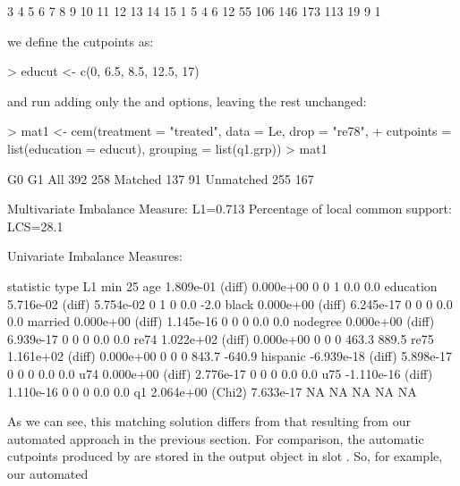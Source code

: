 \documentclass[article]{jss}
\begin{document}
\begin{Schunk}
\begin{Soutput}
  3   4   5   6   7   8   9  10  11  12  13  14  15 
  1   5   4   6  12  55 106 146 173 113  19   9   1 
\end{Soutput}
\end{Schunk}
we define the cutpoints as:
\begin{Schunk}
\begin{Sinput}
> educut <- c(0, 6.5, 8.5, 12.5, 17)
\end{Sinput}
\end{Schunk}
and run  adding only the  and
 options, leaving the rest unchanged:
\begin{Schunk}
\begin{Sinput}
> mat1 <- cem(treatment = "treated", data = Le, drop = "re78", 
+     cutpoints = list(education = educut), grouping = list(q1.grp))
> mat1
\end{Sinput}
\begin{Soutput}
           G0  G1
All       392 258
Matched   137  91
Unmatched 255 167


Multivariate Imbalance Measure: L1=0.713
Percentage of local common support: LCS=28.1%

Univariate Imbalance Measures:

           statistic   type        L1 min 25%
age        1.809e-01 (diff) 0.000e+00   0   0   1   0.0    0.0
education  5.716e-02 (diff) 5.754e-02   0   1   0   0.0   -2.0
black      0.000e+00 (diff) 6.245e-17   0   0   0   0.0    0.0
married    0.000e+00 (diff) 1.145e-16   0   0   0   0.0    0.0
nodegree   0.000e+00 (diff) 6.939e-17   0   0   0   0.0    0.0
re74       1.022e+02 (diff) 0.000e+00   0   0   0 463.3  889.5
re75       1.161e+02 (diff) 0.000e+00   0   0   0 843.7 -640.9
hispanic  -6.939e-18 (diff) 5.898e-17   0   0   0   0.0    0.0
u74        0.000e+00 (diff) 2.776e-17   0   0   0   0.0    0.0
u75       -1.110e-16 (diff) 1.110e-16   0   0   0   0.0    0.0
q1         2.064e+00 (Chi2) 7.633e-17  NA  NA  NA    NA     NA
\end{Soutput}
\end{Schunk}
%
As we can see, this matching solution differs from that resulting from
our automated approach in the previous section.  For comparison, the
automatic cutpoints produced by  are stored in the output
object in slot .  So, for example, our automated
\end{document}
